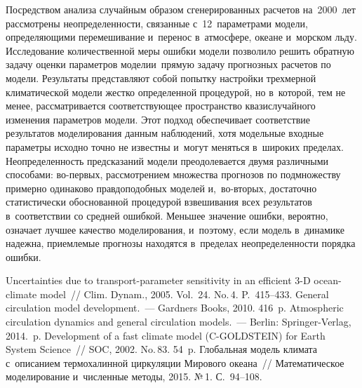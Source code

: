 \begin{multicols}{2}
  Посредством анализа случайным образом сгенерированных расчетов 
на~2000~лет рассмотрены неопределенности, связанные с~12~параметрами 
модели, определяющими перемешивание и~перенос в~атмосфере, океане 
и~морском льду. Исследование количественной меры ошибки модели 
позволило\linebreak
 решить обратную задачу оценки параметров модели\linebreak и~прямую 
задачу прогнозных расчетов по модели. Результаты представляют собой 
попытку настройки трехмерной климатической модели жестко определенной 
процедурой, но в~которой, тем не менее, рассматривается соответствующее 
пространство квазислучайного изменения параметров модели. Этот подход 
обеспечивает соответствие результатов моделирования данным наблюдений, 
хотя модельные входные параметры исходно точно не известны и~могут 
меняться в~широких пределах. Неопределенность предсказаний модели 
преодолевается двумя различными способами: во-пер\-вых, рассмотрением 
множества прогнозов по подмножеству примерно одинаково правдоподобных 
моделей и,~во-вто\-рых, достаточно статистически обосно\-ван\-ной процедурой 
взвешивания всех результатов в~соответствии со средней ошибкой. Меньшее 
значение ошибки, вероятно, означает лучшее качество моделирования, 
и~поэтому, если модель в~динамике надежна, приемлемые прогнозы находятся 
в~пределах неопределенности порядка ошибки. 

\vspace*{-20pt}
  
{\small\frenchspacing
 {%
 \begin{thebibliography}{9}
 
 \vspace*{-2pt}
 
   Uncertainties due to transport-parameter 
sensitivity in an efficient 3-D ocean-climate model~// Clim. Dynam., 2005. 
Vol.~24. No.\,4. P.~415--433.
 General circulation model development.~--- Gardners Books, 
2010. 416~p. 
   Atmospheric circulation dynamics and general circulation 
models.~--- Berlin: Springer-Verlag, 2014.~p.
   Development of a fast climate 
model (C-GOLDSTEIN) for Earth System Science~// SOC, 2002. No.\,83. 54~p.
   Глобальная модель климата с~описанием 
термохалинной циркуляции Мирового океана~// Математическое 
моделирование и~численные методы, 2015. №\,1. С.~94--108.


\end{thebibliography}}}
\end{multicols}
